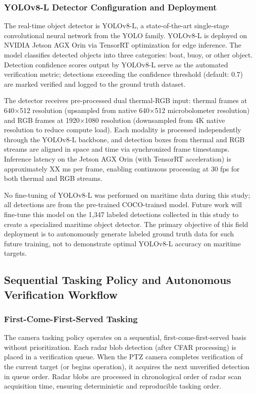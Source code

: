 \documentclass[twocolumn, 10pt]{article}
\begin{document}
\subsubsection{YOLOv8-L Detector Configuration and Deployment}

The real-time object detector is YOLOv8-L, a state-of-the-art single-stage convolutional neural network from the YOLO family. YOLOv8-L is deployed on NVIDIA Jetson AGX Orin via TensorRT optimization for edge inference. The model classifies detected objects into three categories: boat, buoy, or other object. Detection confidence scores output by YOLOv8-L serve as the automated verification metric; detections exceeding the confidence threshold (default: 0.7) are marked verified and logged to the ground truth dataset.

The detector receives pre-processed dual thermal-RGB input: thermal frames at 640×512 resolution (upsampled from native 640×512 microbolometer resolution) and RGB frames at 1920×1080 resolution (downsampled from 4K native resolution to reduce compute load). Each modality is processed independently through the YOLOv8-L backbone, and detection boxes from thermal and RGB streams are aligned in space and time via synchronized frame timestamps. Inference latency on the Jetson AGX Orin (with TensorRT acceleration) is approximately XX ms per frame, enabling continuous processing at 30 fps for both thermal and RGB streams.

No fine-tuning of YOLOv8-L was performed on maritime data during this study; all detections are from the pre-trained COCO-trained model. Future work will fine-tune this model on the 1,347 labeled detections collected in this study to create a specialized maritime object detector. The primary objective of this field deployment is to autonomously generate labeled ground truth data for such future training, not to demonstrate optimal YOLOv8-L accuracy on maritime targets.

\subsection{Sequential Tasking Policy and Autonomous Verification Workflow}

\subsubsection{First-Come-First-Served Tasking}

The camera tasking policy operates on a sequential, first-come-first-served basis without prioritization. Each radar blob detection (after CFAR processing) is placed in a verification queue. When the PTZ camera completes verification of the current target (or begins operation), it acquires the next unverified detection in queue order. Radar blobs are processed in chronological order of radar scan acquisition time, ensuring deterministic and reproducible tasking order.
\end{document}
